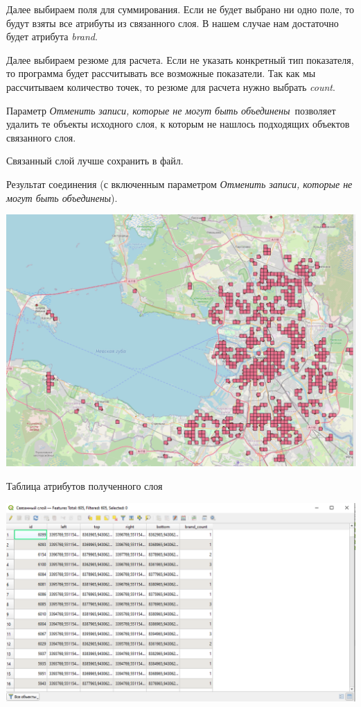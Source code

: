 \documentclass[
]{book}
\begin{document}
Далее выбираем поля для суммирования. Если не будет выбрано ни одно поле, то будут взяты все атрибуты из связанного слоя. В нашем случае нам достаточно будет атрибута \emph{brand}.

Далее выбираем резюме для расчета. Если не указать конкретный тип показателя, то программа будет рассчитывать все возможные показатели. Так как мы рассчитываем количество точек, то резюме для расчета нужно выбрать \emph{count}.

Параметр \emph{Отменить записи, которые не могут быть объединены}~позволяет удалить те объекты исходного слоя, к которым не нашлось подходящих объектов связанного слоя.

Связанный слой лучше сохранить в файл.

Результат соединения (с включенным параметром \emph{Отменить записи, которые не могут быть объединены}).

\includegraphics{figures/19.png}

Таблица атрибутов полученного слоя

\includegraphics{figures/20.png}
\end{document}
